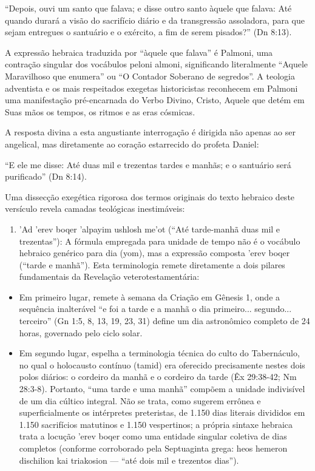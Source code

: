 \documentclass[11pt,a4paper,openany]{book}
\begin{document}
``Depois, ouvi um santo que falava; e disse outro santo àquele que falava: Até quando durará a visão do sacrifício diário e da transgressão assoladora, para que sejam entregues o santuário e o exército, a fim de serem pisados?'' (Dn 8:13).

A expressão hebraica traduzida por ``àquele que falava'' é Palmoni, uma contração singular dos vocábulos peloni almoni, significando literalmente ``Aquele Maravilhoso que enumera'' ou ``O Contador Soberano de segredos''. A teologia adventista e os mais respeitados exegetas historicistas reconhecem em Palmoni uma manifestação pré-encarnada do Verbo Divino, Cristo, Aquele que detém em Suas mãos os tempos, os ritmos e as eras cósmicas.

A resposta divina a esta angustiante interrogação é dirigida não apenas ao ser angelical, mas diretamente ao coração estarrecido do profeta Daniel:

``E ele me disse: Até duas mil e trezentas tardes e manhãs; e o santuário será purificado'' (Dn 8:14).

Uma dissecção exegética rigorosa dos termos originais do texto hebraico deste versículo revela camadas teológicas inestimáveis:
\begin{enumerate}
  \item 'Ad 'erev boqer 'alpayim ushlosh me'ot (``Até tarde-manhã duas mil e trezentas''): A fórmula empregada para unidade de tempo não é o vocábulo hebraico genérico para dia (yom), mas a expressão composta 'erev boqer (``tarde e manhã''). Esta terminologia remete diretamente a dois pilares fundamentais da Revelação veterotestamentária:
\end{enumerate}

\begin{itemize}
  \item Em primeiro lugar, remete à semana da Criação em Gênesis 1, onde a sequência inalterável ``e foi a tarde e a manhã o dia primeiro... segundo... terceiro'' (Gn 1:5, 8, 13, 19, 23, 31) define um dia astronômico completo de 24 horas, governado pelo ciclo solar.
  \item Em segundo lugar, espelha a terminologia técnica do culto do Tabernáculo, no qual o holocausto contínuo (tamid) era oferecido precisamente nestes dois polos diários: o cordeiro da manhã e o cordeiro da tarde (Êx 29:38-42; Nm 28:3-8). Portanto, ``uma tarde e uma manhã'' compõem a unidade indivisível de um dia cúltico integral. Não se trata, como sugerem errônea e superficialmente os intérpretes preteristas, de 1.150 dias literais divididos em 1.150 sacrifícios matutinos e 1.150 vespertinos; a própria sintaxe hebraica trata a locução 'erev boqer como uma entidade singular coletiva de dias completos (conforme corroborado pela Septuaginta grega: heos hemeron dischilion kai triakosion — ``até dois mil e trezentos dias'').
\end{itemize}
\end{document}
